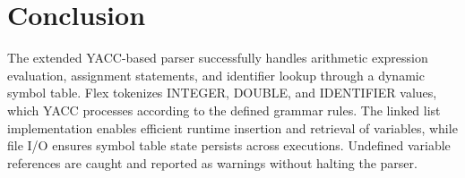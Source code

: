 \documentclass{article}
\begin{document}
\section{Conclusion}
The extended YACC-based parser successfully handles arithmetic expression evaluation, assignment statements, and identifier lookup through a dynamic symbol table. Flex tokenizes INTEGER, DOUBLE, and IDENTIFIER values, which YACC processes according to the defined grammar rules. The linked list implementation enables efficient runtime insertion and retrieval of variables, while file I/O ensures symbol table state persists across executions. Undefined variable references are caught and reported as warnings without halting the parser.
\end{document}
